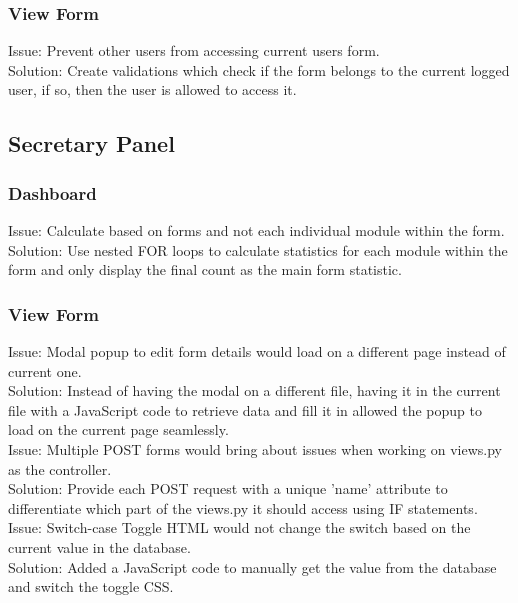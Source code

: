 \documentclass[../main.tex]{subfiles}
\begin{document}
\subsubsection{View Form}
Issue: Prevent other users from accessing current users form.                                                                   \\
Solution: Create validations which check if the form belongs to the current logged user, if so, then the user is allowed to access it.                                                                               \\[2mm]


\subsection{Secretary Panel}

\subsubsection{Dashboard}
Issue: Calculate based on forms and not each individual module within the form.\\
Solution: Use nested FOR loops to calculate statistics for each module within the form and only display the final count as the main form statistic.                                                     \\[2mm]

\subsubsection{View Form}
Issue: Modal popup to edit form details would load on a different page instead of current one.\\
Solution: Instead of having the modal on a different file, having it in the current file with a JavaScript code to retrieve data and fill it in allowed the popup to load on the current page seamlessly.\\[2mm]

Issue: Multiple POST forms would bring about issues when working on views.py as the controller.\\
Solution: Provide each POST request with a unique 'name' attribute to differentiate which part of the views.py it should access using IF statements.\\[2mm]

Issue: Switch-case Toggle HTML would not change the switch based on the current value in the database.\\
Solution: Added a JavaScript code to manually get the value from the database and switch the toggle CSS.                                                                                                \\[2mm]
\end{document}

